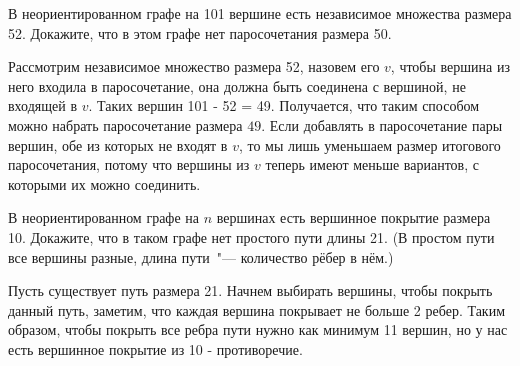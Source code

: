 \documentclass[11pt]{article}
\begin{document}
\p В неориентированном графе на 101 вершине есть независимое множества размера 52. Докажите, что в этом графе нет паросочетания размера 50. 

Рассмотрим независимое множество размера 52, назовем его $v$, чтобы вершина из него входила в паросочетание, 
она должна быть соединена с вершиной, не входящей в $v$.
Таких вершин 101 - 52 = 49. Получается, что таким способом можно набрать паросочетание размера $49$. 
Если добавлять в паросочетание пары вершин, обе из которых не входят в $v$, 
то мы лишь уменьшаем размер итогового паросочетания,
потому что вершины из $v$ теперь имеют меньше вариантов, с которыми их можно соединить.

\p В неориентированном графе на $n$ вершинах есть вершинное покрытие размера
10. Докажите, что в таком графе нет простого пути длины 21. (В простом
пути все вершины разные, длина пути~"--- количество рёбер в нём.)

Пусть существует путь размера 21.
Начнем выбирать вершины, чтобы покрыть данный путь, заметим, что каждая вершина покрывает не больше 2 ребер. 
Таким образом, чтобы покрыть все ребра пути нужно как минимум 11 вершин, но у нас есть вершинное покрытие из 10 - противоречие. 
\end{document}
